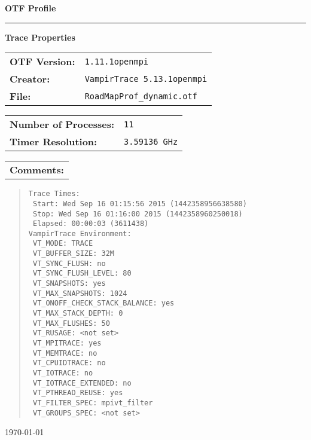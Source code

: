 \documentclass[a4paper,10pt]{article}
\begin{document}
\begin{titlepage}\thispagestyle{empty}
\begin{huge}\begin{flushleft}\bf{OTF Profile}\end{flushleft}\end{huge}
\hrule
\begin{flushright}\textbf{\large Trace Properties}\end{flushright}
\vspace{0.5\baselineskip}
\begin{flushleft}
\begin{tabular}{ll}
\bf{OTF Version:} & \verb|1.11.1openmpi| \\
\bf{Creator:} & \verb|VampirTrace 5.13.1openmpi|\\
\bf{File:} & \verb|RoadMapProf_dynamic.otf|
\end{tabular}

\vspace{1\baselineskip}
\begin{tabular}{ll}
\bf{Number of Processes:} & \verb|11|\\
\bf{Timer Resolution:} & \verb|3.59136 GHz|
\end{tabular}

\vspace{1\baselineskip}
\begin{tabular}{l}\bf{Comments:}\end{tabular}
\begin{quote}\begin{verbatim}
Trace Times:
 Start: Wed Sep 16 01:15:56 2015 (1442358956638580)
 Stop: Wed Sep 16 01:16:00 2015 (1442358960250018)
 Elapsed: 00:00:03 (3611438)
VampirTrace Environment:
 VT_MODE: TRACE
 VT_BUFFER_SIZE: 32M
 VT_SYNC_FLUSH: no
 VT_SYNC_FLUSH_LEVEL: 80
 VT_SNAPSHOTS: yes
 VT_MAX_SNAPSHOTS: 1024
 VT_ONOFF_CHECK_STACK_BALANCE: yes
 VT_MAX_STACK_DEPTH: 0
 VT_MAX_FLUSHES: 50
 VT_RUSAGE: <not set>
 VT_MPITRACE: yes
 VT_MEMTRACE: no
 VT_CPUIDTRACE: no
 VT_IOTRACE: no
 VT_IOTRACE_EXTENDED: no
 VT_PTHREAD_REUSE: yes
 VT_FILTER_SPEC: mpivt_filter
 VT_GROUPS_SPEC: <not set>
\end{verbatim}\end{quote}
\end{flushleft}
\vspace*{\fill}
\begin{flushright}\today\end{flushright}
\end{titlepage}
\end{document}
